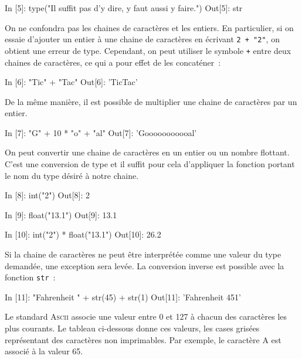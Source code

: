 \documentclass{magnoliaold}
\begin{document}
\begin{pythoncode}
In [5]: type("Il suffit pas d'y dire, y faut aussi y faire.")
Out[5]: str
\end{pythoncode}

\noindent
On ne confondra pas les chaines de caractères et les entiers. En particulier, si on
essaie d'ajouter un entier à une chaine de caractères en écrivant \og\verb_2 + "2"_\fg,
on obtient une erreur de type. Cependant, on peut utiliser le symbole \verb_+_ entre
deux chaines de caractères, ce qui a pour effet de les concaténer~:

\begin{pythoncode}
In [6]: "Tic" + "Tac"
Out[6]: 'TicTac'
\end{pythoncode}

\noindent
De la même manière, il est possible de multiplier une chaine de caractères par un entier.

\begin{pythoncode}
In [7]: "G" + 10 * "o" + "al"
Out[7]: 'Gooooooooooal'
\end{pythoncode}

On peut convertir une chaine de caractères en un entier ou un nombre flottant.
C'est une conversion de type et il suffit
pour cela d'appliquer la fonction portant le nom du type désiré à notre chaine.


\begin{pythoncode}
In [8]: int("2")
Out[8]: 2

In [9]: float("13.1")
Out[9]: 13.1

In [10]: int("2") * float("13.1")
Out[10]: 26.2   
\end{pythoncode}

\noindent Si la chaine de caractères ne peut être interprétée comme une valeur du type demandée, une exception sera
levée. La conversion inverse est possible avec la fonction \verb_str_~:

\begin{pythoncode}
In [11]: "Fahrenheit " + str(45) + str(1)
Out[11]: 'Fahrenheit 451'
\end{pythoncode}

Le standard \textsc{Ascii} associe une valeur entre 0 et 127 à chacun des caractères les plus courants.
Le tableau ci-dessous donne ces valeurs, les cases grisées représentant des caractères non imprimables.
Par exemple, le caractère A est associé à la valeur 65.
\end{document}
